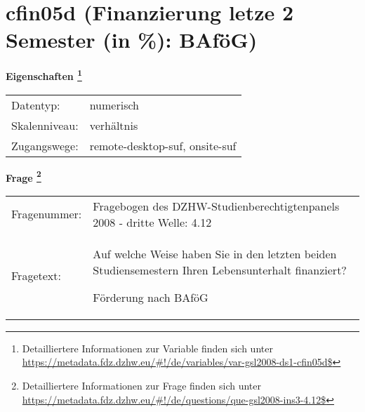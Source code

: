 
    \setcounter{footnote}{0}

    \vspace*{-1.8cm}
	\section{cfin05d (Finanzierung letze 2 Semester (in \%): BAföG)}
	\label{section:cfin05d}



    \vspace*{0.5cm}
    \noindent\textbf{Eigenschaften
	\footnote{Detailliertere Informationen zur Variable finden sich unter
		\url{https://metadata.fdz.dzhw.eu/\#!/de/variables/var-gsl2008-ds1-cfin05d$}}}\\
	\begin{tabularx}{\hsize}{@{}lX}
	Datentyp: & numerisch \\
	Skalenniveau: & verhältnis \\
	Zugangswege: &
	  remote-desktop-suf, 
	  onsite-suf
 \\
    \end{tabularx}



				\vspace*{0.5cm}
                \noindent\textbf{Frage
	                \footnote{Detailliertere Informationen zur Frage finden sich unter
		              \url{https://metadata.fdz.dzhw.eu/\#!/de/questions/que-gsl2008-ins3-4.12$}}}\\
				\begin{tabularx}{\hsize}{@{}lX}
					Fragenummer: &
					  Fragebogen des DZHW-Studienberechtigtenpanels 2008 - dritte Welle:
					  4.12
 \\
					Fragetext: & Auf welche Weise haben Sie in den letzten beiden Studiensemestern Ihren Lebensunterhalt finanziert?\par  Förderung nach BAföG \\
				\end{tabularx}





